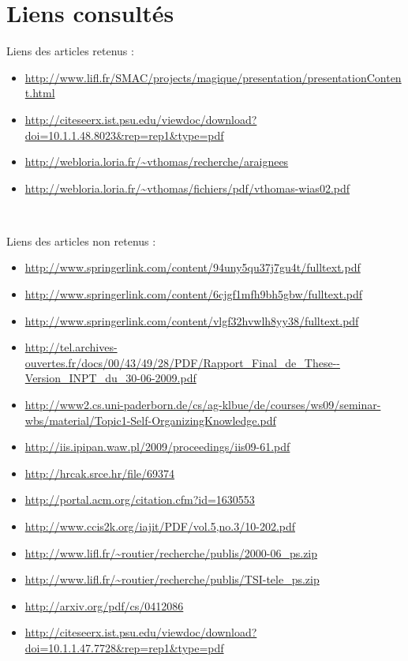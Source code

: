 \section*{Liens consultés}
Liens des articles retenus :
\begin{small}
\begin{itemize}
\item \cite{m1} \url{http://www.lifl.fr/SMAC/projects/magique/presentation/presentationContent.html}
\item \cite{m2} \url{http://citeseerx.ist.psu.edu/viewdoc/download?doi=10.1.1.48.8023\&rep=rep1\&type=pdf}
\item \cite{spiders1} \url{http://webloria.loria.fr/~vthomas/recherche/araignees}
\item \cite{spiders2} \url{http://webloria.loria.fr/~vthomas/fichiers/pdf/vthomas-wias02.pdf}
\end{itemize}
  \end{small}
~

Liens des articles non retenus :
\begin{small}
\begin{itemize}
  \item \url{http://www.springerlink.com/content/94uny5qu37j7gu4t/fulltext.pdf}
  \item \url{http://www.springerlink.com/content/6cjgf1mfh9bh5gbw/fulltext.pdf}
  \item \url{http://www.springerlink.com/content/vlgf32hvwlh8yy38/fulltext.pdf}
  \item \url{http://tel.archives-ouvertes.fr/docs/00/43/49/28/PDF/Rapport_Final_de_These--Version_INPT_du_30-06-2009.pdf}
  \item \url{http://www2.cs.uni-paderborn.de/cs/ag-klbue/de/courses/ws09/seminar-wbs/material/Topic1-Self-OrganizingKnowledge.pdf}
  \item \url{http://iis.ipipan.waw.pl/2009/proceedings/iis09-61.pdf}
  \item \url{http://hrcak.srce.hr/file/69374}
  \item \url{http://portal.acm.org/citation.cfm?id=1630553}
  \item \url{http://www.ccis2k.org/iajit/PDF/vol.5,no.3/10-202.pdf}
  \item \url{http://www.lifl.fr/~routier/recherche/publis/2000-06\_ps.zip}
  \item \url{http://www.lifl.fr/~routier/recherche/publis/TSI-tele\_ps.zip}
  \item \url{http://arxiv.org/pdf/cs/0412086}
  \item \url{http://citeseerx.ist.psu.edu/viewdoc/download?doi=10.1.1.47.7728\&rep=rep1\&type=pdf}

\end{itemize}
\end{small}


